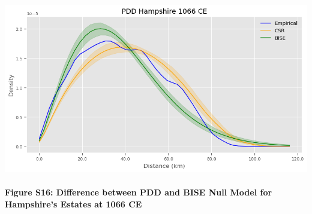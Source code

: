 \documentclass[
  11pt,
  letterpaper,
  DIV=11,
  numbers=noendperiod]{scrartcl}
\let\oldparagraph\paragraph
\renewcommand{\paragraph}[1]{\oldparagraph{#1}\mbox{}}
\begin{document}
\includegraphics{analysis_files/figure-pdf/cell-30-output-1.png}

\paragraph{Figure S16: Difference between PDD and BISE Null Model for
Hampshire's Estates at 1066
CE}\label{figure-s16-difference-between-pdd-and-bise-null-model-for-hampshires-estates-at-1066-ce}
\end{document}
